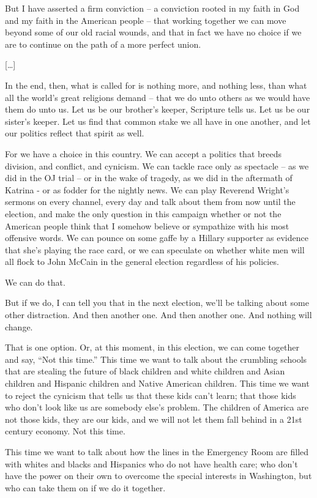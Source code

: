 \documentclass[10pt,a4paper]{article}
\begin{document}
But I have asserted a firm conviction – a conviction rooted in my faith in God and my faith in the American people – that working together we can move beyond some of our old racial wounds, and that in fact we have no choice if we are to continue on the path of a more perfect union. 

[…]

In the end, then, what is called for is nothing more, and nothing less, than what all the world’s great religions demand – that we do unto others as we would have them do unto us. Let us be our brother’s keeper, Scripture tells us. Let us be our sister’s keeper. Let us find that common stake we all have in one another, and let our politics reflect that spirit as well. 

For we have a choice in this country. We can accept a politics that breeds division, and conflict, and cynicism. We can tackle race only as spectacle – as we did in the OJ trial – or in the wake of tragedy, as we did in the aftermath of Katrina - or as fodder for the nightly news. We can play Reverend Wright’s sermons on every channel, every day and talk about them from now until the election, and make the only question in this campaign whether or not the American people think that I somehow believe or sympathize with his most offensive words. We can pounce on some gaffe by a Hillary supporter as evidence that she’s playing the race card, or we can speculate on whether white men will all flock to John McCain in the general election regardless of his policies.

We can do that.

But if we do, I can tell you that in the next election, we’ll be talking about some other distraction. And then another one. And then another one. And nothing will change. 

That is one option. Or, at this moment, in this election, we can come together and say, “Not this time.” This time we want to talk about the crumbling schools that are stealing the future of black children and white children and Asian children and Hispanic children and Native American children. This time we want to reject the cynicism that tells us that these kids can’t learn; that those kids who don’t look like us are somebody else’s problem. The children of America are not those kids, they are our kids, and we will not let them fall behind in a 21st century economy. Not this time. 

This time we want to talk about how the lines in the Emergency Room are filled with whites and blacks and Hispanics who do not have health care; who don’t have the power on their own to overcome the special interests in Washington, but who can take them on if we do it together. 
\end{document}
